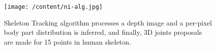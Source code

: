 \begin{figure}
	[h] \centering 
	\texttt{[image: /content/ni-alg.jpg]} \caption{Skeleton Tracking algorithm processes a depth image and a per-pixel body part distribution is inferred, and finally, 3D joints proposals are made for 15 points in human skeleton. \cite{13} } \label{fg:ni:alg} 
\end{figure}
